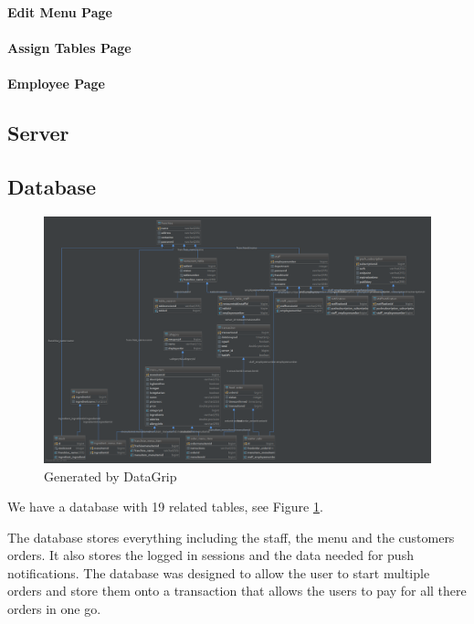 \documentclass[12pt, twoside, a4paper]{report}
\begin{document}
\paragraph{Edit Menu Page}

\paragraph{Assign Tables Page}

\paragraph{Employee Page}

\subsection*{Server}

\subsection*{Database}
\begin{figure}[h]
  \centering
  \includegraphics[width=15cm]{database.png}
  \caption{Generated by DataGrip}
  \label{fig:data}
\end{figure}

We have a database with 19 related tables, see Figure \ref{fig:data}. 

The database stores everything including the staff, the menu and the customers orders. 
It also stores the logged in sessions and the data needed for push notifications.
The database was designed to allow the user to start multiple orders and store them onto a transaction that allows the users to pay for all there orders in one go.
\end{document}
